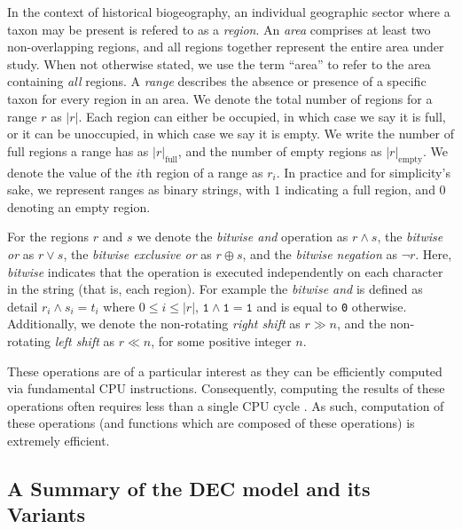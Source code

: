 \documentclass[a4paper]{article}
\newcommand{\CountFull}[1]{|#1|_\text{full}}
\newcommand{\CountEmpty}[1]{|#1|_\text{empty}}
\newcommand{\rand}[2]{#1 \land #2}
\newcommand{\ror}[2]{#1 \lor #2}
\newcommand{\rneg}[1]{\neg #1}
\newcommand{\rxor}[2]{#1 \oplus #2}
\newcommand{\rLshift}[2]{#1 \ll #2}
\newcommand{\rRshift}[2]{#1 \gg #2}
\begin{document}
In the context of historical biogeography, an individual geographic sector where a taxon may be present is refered to as a \textit{region}.
An \textit{area} comprises at least two non-overlapping regions, and all regions together represent the entire area under study.
When not otherwise stated, we use the term ``area'' to refer to the area containing \textit{all} regions.
A \textit{range} describes the absence or presence of a specific taxon for every region in an area.
We denote the total number of regions for a range \( r \) as \( |r| \).
Each region can either be occupied, in which case we say it is full, or it can be unoccupied, in which case we say it is
empty.
We write the number of full regions a range has as \( \CountFull{r} \), and the number of empty regions as \(
\CountEmpty{r} \).
We denote the value of the $i$th region of a range as $r_i$.
In practice and for simplicity's sake, we represent ranges as binary strings, with $1$ indicating a full region, and $0$
denoting an empty region.

For the regions $r$ and $s$ we denote the \textit{bitwise and} operation as $\rand{r}{s}$, the \textit{bitwise or} as $\ror{r}{s}$,
the \textit{bitwise exclusive or} as $\rxor{r}{s}$, and the \textit{bitwise negation} as $\rneg{r}$.
Here, \textit{bitwise} indicates that the operation is executed independently on each character in the string (that is,
each region). 
For example the \textit{bitwise and} is defined as detail $r_i \land s_i = t_i$ where $0 \leq i \leq |r|$, $\texttt{1}
\land \texttt{1} = \texttt{1}$ and is equal to \texttt{0} otherwise.
Additionally, we denote the non-rotating \textit{right shift} as $\rRshift{r}{n}$, and the non-rotating \textit{left shift} as
$\rLshift{r}{n}$, for some positive integer $n$.

These operations are of a particular interest as they can be efficiently computed via fundamental CPU instructions.
Consequently, computing the results of these operations often requires less than a single CPU cycle\footnotemark
\citep{Abel19a}.
As such, computation of these operations (and functions which are composed of these operations) is extremely efficient.


\subsection{A Summary of the DEC model and its Variants} \label{sec:model}
\end{document}
